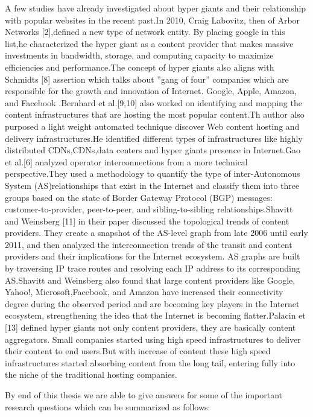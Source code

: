A few studies have already investigated about hyper giants and their relationship with popular websites in the recent past.In 2010, Craig Labovitz, then
of Arbor Networks [2],defined a new type of network entity. By placing google
in this list,he characterized the hyper giant as a content provider that makes
massive investments in bandwidth, storage, and computing capacity to maximize efficiencies and performance.The concept of hyper giants also aligns with
Schmidts [8] assertion which talks about ”gang of four” companies which are responsible for the growth and innovation of Internet. Google, Apple, Amazon,
and Facebook .Bernhard et al.[9,10] also worked on identifying and mapping the
content infrastructures that are hosting the most popular content.Th author also purposed a light weight automated technique discover Web content hosting and delivery infrastructures.He identified different types of infrastructures like highly distributed CDNs,CDNs,data centers and hyper giants presence in Internet.Gao et al.[6] analyzed operator interconnections from a more technical perspective.They used a methodology to quantify the type of inter-Autonomous System (AS)relationships that exist in the Internet and classify them into three groups based
on the state of Border Gateway Protocol (BGP) messages: customer-to-provider,
peer-to-peer, and sibling-to-sibling relationships.Shavitt and Weinsberg [11] in their paper
discussed the topological trends of content providers. They create a snapshot
of the AS-level graph from late 2006 until early 2011, and then analyzed the interconnection trends of the transit and content providers and their implications for the Internet ecosystem. AS graphs are built by traversing IP trace routes and resolving each IP address to its corresponding AS.Shavitt and Weinsberg also found that large content providers like Google, Yahoo!, Microsoft,Facebook, and Amazon have increased their connectivity degree during the observed period and are becoming key players in the Internet ecosystem, strengthening the
idea that the Internet is becoming flatter.Palacin et [13] defined hyper giants not
only content providers, they are basically content aggregators. Small companies started using high speed infrastructures to deliver their content to end users.But with increase of content  these high speed infrastructures started absorbing content from the
long tail, entering fully into the niche of the traditional hosting companies.

By end of this thesis we are able to give answers for some of the important
research questions which can be summarized as follows:

